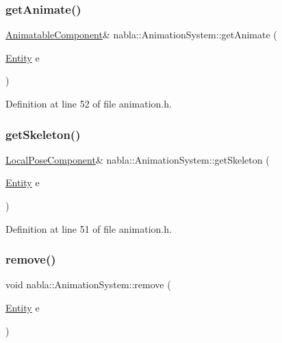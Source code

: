 \subsubsection{\texorpdfstring{getAnimate()}{getAnimate()}}
{\footnotesize\ttfamily \mbox{\hyperlink{structnabla_1_1_animatable_component}{Animatable\+Component}}\& nabla\+::\+Animation\+System\+::get\+Animate (\begin{DoxyParamCaption}\item[{\mbox{\hyperlink{structnabla_1_1_entity}{Entity}}}]{e }\end{DoxyParamCaption})\hspace{0.3cm}{\ttfamily [inline]}}



Definition at line 52 of file animation.\+h.

\mbox{\label{classnabla_1_1_animation_system_a040b464a66763e67f1f557d9a14236b3}} 
\subsubsection{\texorpdfstring{getSkeleton()}{getSkeleton()}}
{\footnotesize\ttfamily \mbox{\hyperlink{structnabla_1_1_local_pose_component}{Local\+Pose\+Component}}\& nabla\+::\+Animation\+System\+::get\+Skeleton (\begin{DoxyParamCaption}\item[{\mbox{\hyperlink{structnabla_1_1_entity}{Entity}}}]{e }\end{DoxyParamCaption})\hspace{0.3cm}{\ttfamily [inline]}}



Definition at line 51 of file animation.\+h.

\mbox{\label{classnabla_1_1_animation_system_a8cf322b787134b6ea6563adea102ea6d}} 
\subsubsection{\texorpdfstring{remove()}{remove()}}
{\footnotesize\ttfamily void nabla\+::\+Animation\+System\+::remove (\begin{DoxyParamCaption}\item[{\mbox{\hyperlink{structnabla_1_1_entity}{Entity}}}]{e }\end{DoxyParamCaption})\hspace{0.3cm}{\ttfamily [inline]}}



